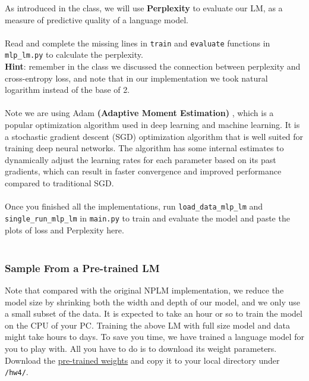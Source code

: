 As introduced in the class, we will use \textbf{Perplexity} to evaluate our LM, as a measure of predictive quality of a language model. \\\\
\noindent \todo{} Read and complete the missing lines in \texttt{train} and \texttt{evaluate} functions in \texttt{mlp\_lm.py} to calculate the perplexity.\\
\noindent \textbf{Hint}: remember in the class we discussed the connection between perplexity and cross-entropy loss, and note that in our implementation we took natural logarithm instead of the base of 2.\\\\
Note we are using Adam \textbf{(Adaptive Moment Estimation)} \citep{kingma2015adam}, which is a popular optimization algorithm used in deep learning and machine learning. It is a stochastic gradient descent (SGD) optimization algorithm that is well suited for training deep neural networks. The algorithm has some internal estimates to dynamically adjust the learning rates for each parameter based on its past gradients, which can result in faster convergence and improved performance compared to traditional SGD.\\\\
\noindent \todo{} Once you finished all the implementations, run \texttt{load\_data\_mlp\_lm} and \texttt{single\_run\_mlp\_lm} in \texttt{main.py} to train and evaluate the model and paste the plots of loss and Perplexity here.\\
\noindent {\color{red}{your plots}}\\

\subsubsection{Sample From a Pre-trained LM}
Note that compared with the original NPLM implementation, we reduce the model size by shrinking both the width and depth of our model, and we only use a small subset of the data. It is expected to take an hour or so to train the model on the CPU of your PC. Training the above LM with full size model and data might take hours to days. To save you time, we have trained a language model for you to play with. All you have to do is to download its weight parameters. Download the 
\href{https://livejohnshopkins-my.sharepoint.com/:u:/g/personal/dkhasha1_jh_edu/EW5N2dBb3ftAnQuannVNU_QBmmEn-VStlnVGWp5mRHdT-Q?e=NIChGd}{pre-trained weights} and copy it to your local directory under \texttt{/hw4/}.

